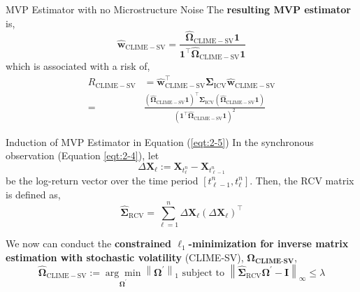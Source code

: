 \documentclass{beamer}
\begin{document}
\begin{frame}{MVP Estimator with no Microstructure Noise}
The \textbf{resulting MVP estimator} is,
\begin{equation}
\label{eqt:2-5}
    \widehat{\boldsymbol{w}}_{\mathrm{CLIME}-\mathrm{SV}}=\frac{\widehat{\boldsymbol{\Omega}}_{\mathrm{CLIME}-\mathrm{SV}} \mathbf{1}}{\mathbf{1}^{\top} \widehat{\boldsymbol{\Omega}}_{\mathrm{CLIME}-\mathrm{SV}} \mathbf{1}}
\end{equation}
which is associated with a risk of,
\begin{equation}
\label{eqt:2-6}
\begin{aligned}
    R_{\mathrm{CLIME}-\mathrm{SV}}&
    =\widehat{\boldsymbol{w}}_{\mathrm{CLIME}-\mathrm{SV}}^{\top} \boldsymbol{\Sigma}_{\mathrm{ICV}} \widehat{\boldsymbol{w}}_{\mathrm{CLIME}-\mathrm{SV}}\\
    =&\frac{\left(\widehat{\boldsymbol{\Omega}}_{\mathrm{CLIME}-\mathrm{SV}} \mathbf{1}\right)^{\top} \boldsymbol{\Sigma}_{\mathrm{ICV}}\left(\widehat{\boldsymbol{\Omega}}_{\mathrm{CLIME}-\mathrm{SV}} \mathbf{1}\right)}{\left(\mathbf{1}^{\top} \widehat{\boldsymbol{\Omega}}_{\mathrm{CLIME}-\mathrm{SV}} \mathbf{1}\right)^2}
\end{aligned}
\end{equation}

\end{frame}

\begin{frame}{Induction of MVP Estimator in Equation (\ref{eqt:2-5})}
In the synchronous observation (Equation \ref{eqt:2-4}), let
$$\Delta \bm{X}_{\ell} := \bm{X}_{t_{\ell}^{n}} - \bm{X}_{t_{\ell -1}^n}$$
be the log-return vector over the time period $[t_{\ell-1}^n, t_{\ell}^n]$. Then, the RCV matrix is defined as,
\begin{equation}
\label{eqt:2-7}
    \widehat{\boldsymbol{\Sigma}}_{\mathrm{RCV}}=\sum_{\ell=1}^n \Delta \mathbf{X}_{\ell}\left(\Delta \mathbf{X}_{\ell}\right)^{\top}
\end{equation}

We now can conduct the \textbf{constrained $\ell_1$-minimization for inverse matrix estimation with stochastic volatility} (CLIME-SV), $\bm{\Omega_{\text{CLIME-SV}}}$,
\begin{equation}
\label{eqt:2-8}
    \widehat{\boldsymbol{\Omega}}_{\mathrm{CLIME}-\mathrm{SV}}:=\underset{\boldsymbol{\Omega}^{\prime}}{\arg \min }\left\|\boldsymbol{\Omega}^{\prime}\right\|_1 \text { subject to }\left\|\widehat{\boldsymbol{\Sigma}}_{\mathrm{RCV}} \boldsymbol{\Omega}^{\prime}-\mathbf{I}\right\|_{\infty} \leq \lambda
\end{equation}



\end{frame}
\end{document}

